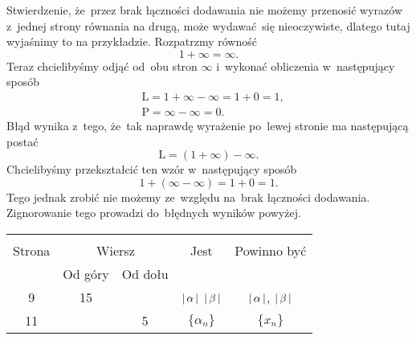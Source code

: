 \documentclass[a4paper,11pt]{article}
\begin{document}
\start {} Stwierdzenie, że~przez brak łączności dodawania nie
możemy przenosić wyrazów z~jednej strony równania na drugą, może
wydawać~się nieoczywiste, dlatego tutaj wyjaśnimy to na przykładzie.
Rozpatrzmy równość
\begin{equation}
  \label{eq:LojasiewiczWDTFRz-06}
  1 + \infty = \infty.
\end{equation}
Teraz chcielibyśmy odjąć od~obu stron $\infty$ i~wykonać obliczenia
w~następujący sposób
\begin{equation}
  \label{eq:LojasiewiczWDTFRz-07}
  \begin{split}
    &\textrm{L} = 1 + \infty - \infty = 1 + 0 = 1, \\
    &\textrm{P} = \infty - \infty = 0.
  \end{split}
\end{equation}
Błąd wynika z~tego, że~tak naprawdę wyrażenie po~lewej stronie ma
następującą postać
\begin{equation}
  \label{eq:LojasiewiczWDTFRz-08}
  \textrm{L} = ( 1 + \infty ) - \infty.
\end{equation}
Chcielibyśmy przekształcić ten wzór w~następujący sposób
\begin{equation}
  \label{eq:LojasiewiczWDTFRz-09}
  1 + ( \infty - \infty ) = 1 + 0 = 1.
\end{equation}
Tego jednak zrobić nie możemy ze~względu na~brak łączności dodawania.
Zignorowanie tego prowadzi do~błędnych wyników powyżej.

\vspace{\spaceFour}







\begin{center}

  \begin{tabular}{|c|c|c|c|c|}
    \hline
    & \multicolumn{2}{c|}{} & & \\
    Strona & \multicolumn{2}{c|}{Wiersz} & Jest
                              & Powinno być \\ \cline{2-3}
    & Od góry & Od dołu & & \\
    \hline
    9   & 15 & & $|\, {  \alpha  } \,|$ $|\, {  \beta  } \,|$
           & $|\, {  \alpha  } \,|$, $|\, {  \beta  } \,|$ \\
    11  & &  5 & $\{ \alpha_{ n } \}$ & $\{ x_{ n } \}$ \\
    \hline
  \end{tabular}

\end{center}
\end{document}
